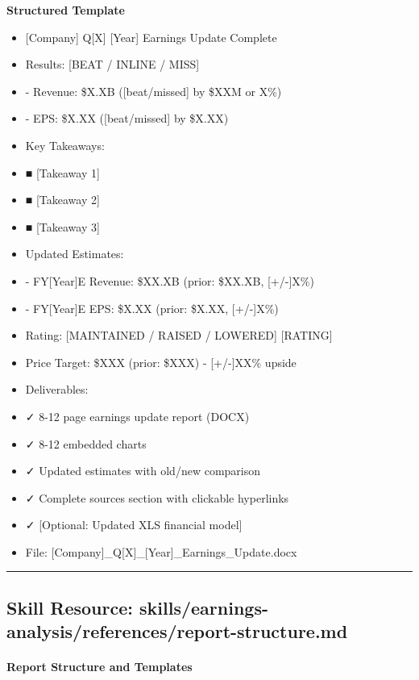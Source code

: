 \documentclass[11pt]{article}
\begin{document}
\textbf{Structured Template}
\begin{itemize}[leftmargin=*,itemsep=2pt,topsep=2pt]
\item {} [Company] Q[X] [Year] Earnings Update Complete
\item {} Results: [BEAT / INLINE / MISS]
\item {} - Revenue: \$X.XB ([beat/missed] by \$XXM or X\%)
\item {} - EPS: \$X.XX ([beat/missed] by \$X.XX)
\item {} Key Takeaways:
\item {} ■ [Takeaway 1]
\item {} ■ [Takeaway 2]
\item {} ■ [Takeaway 3]
\item {} Updated Estimates:
\item {} - FY[Year]E Revenue: \$XX.XB (prior: \$XX.XB, [+/-]X\%)
\item {} - FY[Year]E EPS: \$X.XX (prior: \$X.XX, [+/-]X\%)
\item {} Rating: [MAINTAINED / RAISED / LOWERED] [RATING]
\item {} Price Target: \$XXX (prior: \$XXX) - [+/-]XX\% upside
\item {} Deliverables:
\item {} ✓ 8-12 page earnings update report (DOCX)
\item {} ✓ 8-12 embedded charts
\item {} ✓ Updated estimates with old/new comparison
\item {} ✓ Complete sources section with clickable hyperlinks
\item {} ✓ [Optional: Updated XLS financial model]
\item {} File: [Company]\_\allowbreak{}Q[X]\_\allowbreak{}[Year]\_\allowbreak{}Earnings\_\allowbreak{}Update.docx
\end{itemize}

\vspace{0.8em}\hrule\vspace{0.8em}

\subsection{Skill Resource: skills/earnings-analysis/references/report-structure.md}\label{file:skills-earnings-analysis-references-report-structure-md}

\paragraph{Report Structure and Templates}\mbox{}\par
\end{document}
